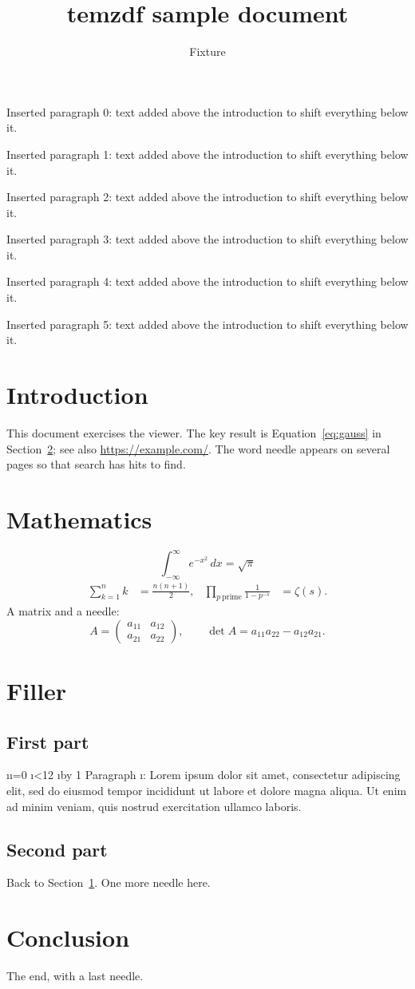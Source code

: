 \documentclass[11pt]{article}
\title{temzdf sample document}
\author{Fixture}
\date{}
\begin{document}
\maketitle
\tableofcontents
Inserted paragraph 0: text added above the introduction to shift everything below it.\par
Inserted paragraph 1: text added above the introduction to shift everything below it.\par
Inserted paragraph 2: text added above the introduction to shift everything below it.\par
Inserted paragraph 3: text added above the introduction to shift everything below it.\par
Inserted paragraph 4: text added above the introduction to shift everything below it.\par
Inserted paragraph 5: text added above the introduction to shift everything below it.\par
\section{Introduction}\label{sec:intro}
This document exercises the viewer. The key result is Equation~\eqref{eq:gauss}
in Section~\ref{sec:math}; see also \url{https://example.com/}.
The word needle appears on several pages so that search has hits to find.
\section{Mathematics}\label{sec:math}
\begin{equation}\label{eq:gauss}
  \int_{-\infty}^{\infty} e^{-x^2}\,dx = \sqrt{\pi}
\end{equation}
\begin{align}
  \sum_{k=1}^{n} k &= \frac{n(n+1)}{2}, &
  \prod_{p\ \text{prime}} \frac{1}{1-p^{-s}} &= \zeta(s).
\end{align}
A matrix and a needle:
\[
  A = \begin{pmatrix} a_{11} & a_{12} \\ a_{21} & a_{22} \end{pmatrix},\qquad
  \det A = a_{11}a_{22} - a_{12}a_{21}.
\]
\newpage
\section{Filler}\label{sec:filler}
\subsection{First part}
\newcount\i \i=0
\loop\ifnum\i<12 \advance\i by 1
Paragraph \the\i: Lorem ipsum dolor sit amet, consectetur adipiscing elit,
sed do eiusmod tempor incididunt ut labore et dolore magna aliqua.
Ut enim ad minim veniam, quis nostrud exercitation ullamco laboris.\par
\repeat
\subsection{Second part}
Back to Section~\ref{sec:intro}. One more needle here.
\newpage
\section{Conclusion}\label{sec:conclusion}
The end, with a last needle.
\end{document}
